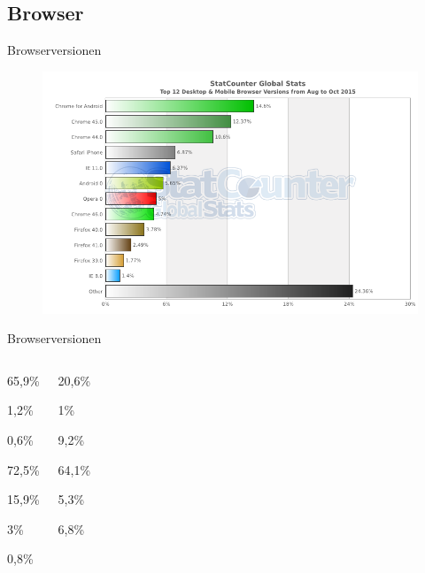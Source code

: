 \documentclass{beamer}
\begin{document}
	\subsection[Browser]{Browser}
	\begin{frame}[t]{Browserversionen}
		\begin{figure}
\centering
\includegraphics[width=0.9\linewidth]{./Bilder/StatCounter-browser_version-ww-monthly-201508-201510-bar}
\label{fig:StatCounter-browser_version-ww-monthly-201508-201510-bar}
\end{figure}

	\end{frame}
	\begin{frame}[t]{Browserversionen}
		\begin{columns}
				\begin{description}	
				\item<1->[Google Chrome] 65,9\%
				\begin{description}
					\item<1->[4.7] 1,2\%
					\item<1->[4.6] 0,6\%
					\item<1-|alert@2>[4.5] 72,5\%
					\item<1->[4.4] 15,9\%
					\item<1->[4.3] 3\%
					\item<1->[4.2] 0,8\%
				\end{description}
			\end{description}
				\column{0.5\textwidth}
				\begin{description}
				\item<2->[Firefox] 20,6\%
					\begin{description}
						\item<2->[FF 42] 1\%
						\item<2->[FF 41] 9,2\%
						\item<2-|alert@2>[FF 40] 64,1\%
						\item<2->[FF 39] 5,3\%
						\item<2->[FF 38] 6,8\%
					\end{description}
				\end{description}
			\end{columns}
		\end{frame}
\end{document}
